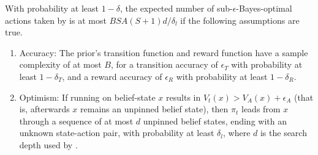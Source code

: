 \begin{thm}
\label{bfs3:proof-of-pacbamdp}
With probability at least $1-\delta$, the expected number of sub-$\epsilon$-Bayes-optimal actions taken by  is at most $BSA(S+1)d/\delta_l$ if the following assumptions are true.
\begin{enumerate}
\item
\label{theorem:cond-acc} 
Accuracy: The prior's transition function and reward function have a sample complexity of at most $B$, for a transition accuracy of $\epsilon_T$ with probability at least $1-\delta_T$, and a reward accuracy of $\epsilon_R$ with probability at least $1-\delta_R$.
\item
\label{bfs3:cond:opt}
Optimism: If running  on belief-state $x$ results in $V_t(x)> V_A(x) + \epsilon_A$ (that is, afterwards $x$ remains an unpinned belief state), then $\pi_t$ leads from $x$ through a sequence of at most $d$ unpinned belief states, ending with an unknown state-action pair, with probability at least $\delta_l$, where $d$ is the search depth used by .
\end{enumerate}
\end{thm}


